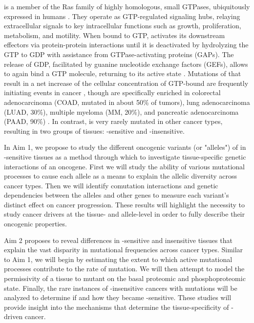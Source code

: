 \kras{} is a member of the Ras family of highly homologous, small GTPases, ubiquitously expressed in humans \cite{Barbacid1987, Prior2012}. 
They operate as GTP-regulated signaling hubs, relaying extracellular signals to key intracellular functions such as growth, proliferation, metabolism, and motility. 
When bound to GTP, \kras{} activates its downstream effectors via protein-protein interactions until it is deactivated by hydrolyzing the GTP to GDP with assistance from GTPase-activating proteins (GAPs). 
The release of GDP, facilitated by guanine nucleotide exchange factors (GEFs), allows \kras{} to again bind a GTP molecule, returning to its active state \cite{Barbacid1987, Johnson2017}. 
Mutations of \KRAS{} that result in a net increase of the cellular concentration of GTP-bound \kras{} are frequently initiating events in cancer \cite{Kanda2012, Zhang2014a, Li2018, Prior2020TheCancer}, though are specifically enriched in colorectal adenocarcinoma (COAD, mutated in about 50\% of tumors), lung adenocarcinoma (LUAD, 30\%), multiple myeloma (MM, 20\%), and pancreatic adenocarcinoma (PAAD, 90\%) \cite{Prior2020TheCancer}.
In contrast, \KRAS{} is very rarely mutated in other cancer types, resulting in two groups of tissues: \KRAS{}-sensitive and \KRAS{}-insensitive.

In Aim 1, we propose to study the different oncogenic variants (or "alleles") of \KRAS{} in \KRAS{}-sensitive tissues as a method through which to investigate tissue-specific genetic interactions of an oncogene.
First we will study the ability of various mutational processes to cause each allele as a means to explain the allelic diversity across cancer types.
Then we will identify comutation interactions and genetic dependencies between the \KRAS{} alleles and other genes to measure each variant's distinct effect on cancer progression.
These results will highlight the necessity to study cancer drivers at the tissue- and allele-level in order to fully describe their oncogenic properties.

Aim 2 proposes to reveal differences in \KRAS{}-sensitive and insensitive tissues that explain the vast disparity in mutational frequencies across cancer types.
Similar to Aim 1, we will begin by estimating the extent to which active mutational processes contribute to the rate of \KRAS{} mutation.
We will then attempt to model the permissivity of a tissue to mutant \KRAS{} on the basal proteomic and phosphoproteomic state.
Finally, the rare instances of \KRAS{}-insensitive cancers with \KRAS{} mutations will be analyzed to determine if and how they became \KRAS{}-sensitive.
These studies will provide insight into the mechanisms that determine the tissue-specificity of \KRAS{}-driven cancer.


